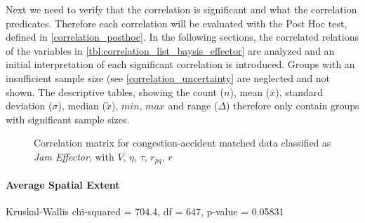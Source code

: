 Next we need to verify that the correlation is significant and what the correlation predicates. Therefore each correlation will be evaluated with the Post Hoc test, defined in \cref{correlation_posthoc}. In the following sections, the correlated relations of the variables in \cref{tbl:correlation_list_baysis_effector} are analyzed and an initial interpretation of each significant correlation is introduced. Groups with an insufficient sample size (see \cref{correlation_uncertainty} are neglected and not shown. The descriptive tables, showing the count ($n$), mean ($\bar{x}$), standard deviation ($\sigma$), median ($\tilde{x}$), $min$, $max$ and range ($\Delta$) therefore only contain groups with significant sample sizes.

\begin{figure}[!ht]
	\centering
	\caption{Correlation matrix for congestion-accident matched data classified as \textit{Jam Effector}, with $V$, $\eta$, $\tau$, $r_{pq}$, $r$}
	\label{img:correlation_matrix_selected_effector_cramers}
\end{figure}


\paragraph{Average Spatial Extent}
Kruskal-Wallis chi-squared = 704.4, df = 647, p-value = 0.05831

